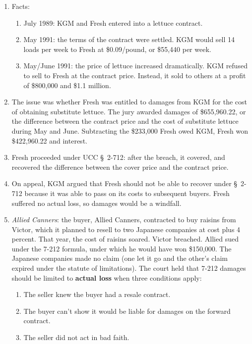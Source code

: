 \begin{enumerate}
    \item Facts:
    \begin{enumerate}
        \item July 1989: KGM and Fresh entered into a lettuce contract.
        \item May 1991: the terms of the contract were settled. KGM would sell 
        14 loads per week to Fresh at \$0.09/pound, or \$55,440 per week.
        \item May/June 1991: the price of lettuce increased dramatically. KGM 
        refused to sell to Fresh at the contract price. Instead, it sold to 
        others at a profit of \$800,000 and \$1.1 million.
    \end{enumerate}
    \item The issue was whether Fresh was entitled to damages from KGM for 
    the cost of obtaining substitute lettuce. The jury awarded damages of 
    \$655,960.22, or the difference between the contract price and the cost of 
    substitute lettuce during May and June. Subtracting the \$233,000 Fresh 
    owed KGM, Fresh won \$422,960.22 and interest.
    \item Fresh proceeded under UCC \S\ 2-712: after the breach, it covered, 
    and recovered the difference between the cover price and the contract 
    price.
    \item On appeal, KGM argued that Fresh should not be able to recover under 
    \S\ 2-712 because it was able to pass on its costs to subsequent buyers. 
    Fresh suffered no actual loss, so damages would be a windfall.
    \item \emph{Allied Canners}: the buyer, Allied Canners, contracted to buy 
    raisins from Victor, which it planned to resell to two Japanese companies 
    at cost plus 4 percent. That year, the cost of raisins soared. Victor 
    breached. Allied sued under the 7-212 formula, under which he would have 
    won \$150,000. The Japanese companies made no claim (one let it go and the 
    other's claim expired under the statute of limitations). The court held 
    that 7-212 damages should be limited to \textbf{actual loss} when three 
    conditions apply:
    \begin{enumerate}
        \item The seller knew the buyer had a resale contract.
        \item The buyer can't show it would be liable for damages on the 
        forward contract.
        \item The seller did not act in bad faith.

\end{enumerate}
\end{enumerate}
